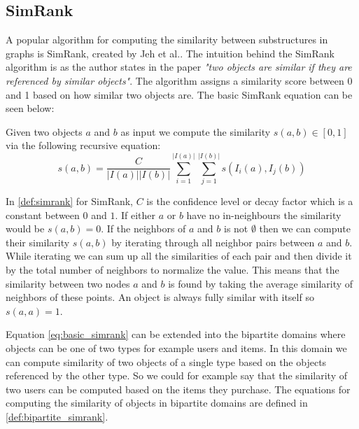 \subsection{SimRank}
\label{Subsec:SimRank}
A popular algorithm for computing the similarity between substructures in graphs is SimRank, created by Jeh et al.\cite{10.1145/775047.775126}.
The intuition behind the SimRank algorithm is as the author states in the paper \emph{"two objects are similar if they are referenced by similar objects"}\cite{10.1145/775047.775126}.
The algorithm assigns a similarity score between 0 and 1 based on how similar two objects are. The basic SimRank equation can be seen below:

\begin{definition}[SimRank]\label{def:simrank} Given two objects $a$ and $b$ as input we compute the similarity $s(a,b) \in [0,1]$ via the following recursive equation:
	\begin{equation}\label{eq:basic_simrank}
	s(a,b)= \frac{C}{|I(a)||I(b)|}\sum^{|I(a)|}_{i=1}\sum^{|I(b)|}_{j=1}s(I_i(a),I_j(b))
	\end{equation}
\end{definition}

In \autoref{def:simrank} for SimRank, $C$ is the confidence level or decay factor which is a constant between $0$ and $1$.
If either $a$ or $b$ have no in-neighbours the similarity would be $s(a,b) = 0$.
If the neighbors of $a$ and $b$  is not $\emptyset$ then we can compute their similarity $s(a,b)$ by iterating through all neighbor pairs between $a$ and $b$.
While iterating we can sum up all the similarities of each pair and then divide it by the total number of neighbors to normalize the value.
This means that the similarity between two nodes $a$ and $b$ is found by taking the average similarity of neighbors of these points.
An object is always fully similar with itself so $s(a,a) = 1$.


Equation \ref{eq:basic_simrank} can be extended into the bipartite domains where objects can be one of two types for example users and items.
In this domain we can compute similarity of two objects of a single type based on the objects referenced by the other type.
So we could for example say that the similarity of two users can be computed based on the items they purchase.
The equations for computing the similarity of objects in bipartite domains are defined in \autoref{def:bipartite_simrank}.


